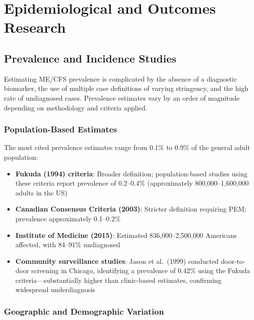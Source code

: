 \chapter{Epidemiological and Outcomes Research}
\label{ch:epidemiology-outcomes}

\section{Prevalence and Incidence Studies}
\label{sec:prevalence-incidence}

Estimating ME/CFS prevalence is complicated by the absence of a diagnostic biomarker, the use of multiple case definitions of varying stringency, and the high rate of undiagnosed cases. Prevalence estimates vary by an order of magnitude depending on methodology and criteria applied.

\subsection{Population-Based Estimates}

The most cited prevalence estimates range from 0.1\% to 0.9\% of the general adult population:

\begin{itemize}
    \item \textbf{Fukuda (1994) criteria}: Broader definition; population-based studies using these criteria report prevalence of 0.2--0.4\% (approximately 800,000--1,600,000 adults in the US)
    \item \textbf{Canadian Consensus Criteria (2003)}: Stricter definition requiring PEM; prevalence approximately 0.1--0.2\%
    \item \textbf{Institute of Medicine (2015)}: Estimated 836,000--2,500,000 Americans affected, with 84--91\% undiagnosed
    \item \textbf{Community surveillance studies}: Jason et al.\ (1999) conducted door-to-door screening in Chicago, identifying a prevalence of 0.42\% using the Fukuda criteria---substantially higher than clinic-based estimates, confirming widespread underdiagnosis
\end{itemize}

\subsection{Geographic and Demographic Variation}

